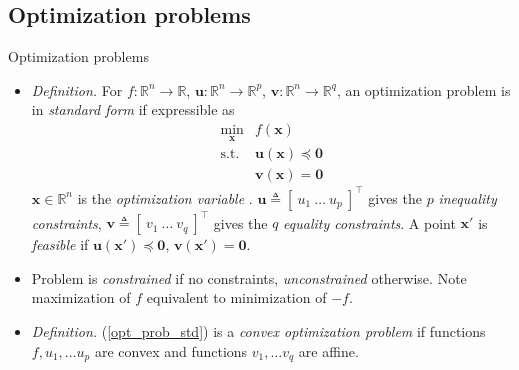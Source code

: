 \documentclass{beamer}
\numberwithin{equation}{section}
\newcommand{\aref}[1]{\alert{\ref{#1}}}
\begin{document}
\subsection{Optimization problems}

\begin{frame}{Optimization problems}
    \begin{itemize}
        \item
        \textit{Definition.} For $ f: \mathbb{R}^n \rightarrow \mathbb{R} $,
        $ \mathbf{u} : \mathbb{R}^n \rightarrow \mathbb{R}^p $,
        $ \mathbf{v} : \mathbb{R}^n \rightarrow \mathbb{R}^q $, an
        optimization problem is in \textit{standard form} if expressible as
        \cite{bv_convex_opt}
        \begin{equation} \label{opt_prob_std}
            \begin{array}{ll}
                \displaystyle\min_\mathbf{x} & f(\mathbf{x}) \\
                \text{s.t.} & \mathbf{u}(\mathbf{x}) \preceq \mathbf{0} \\
                & \mathbf{v}(\mathbf{x}) = \mathbf{0}
            \end{array}
        \end{equation}
        $ \mathbf{x} \in \mathbb{R}^n $ is the \textit{optimization
        variable} \cite{bv_convex_opt}. $ \mathbf{u} \triangleq
        [ \ u_1 \ \ldots \ u_p \ ]^\top $ gives the $ p $ \textit{inequality
        constraints}, $ \mathbf{v} \triangleq [ \ v_1 \ \ldots \ v_q \ ]^\top $
        gives the $ q $ \textit{equality constraints}. A point $ \mathbf{x}' $
        is \textit{feasible} if $ \mathbf{u}(\mathbf{x}') \preceq
        \mathbf{0} $, $ \mathbf{v}(\mathbf{x}') = \mathbf{0} $.

        \item
        Problem is \textit{constrained} if no constraints,
        \textit{unconstrained} otherwise. Note maximization of $ f $ 
        equivalent to minimization of $ -f $.

        \item
        \textit{Definition.} (\aref{opt_prob_std}) is a
        \textit{convex optimization problem} if functions
        $ f, u_1, \ldots u_p $ are convex and functions $ v_1, \ldots v_q $
        are affine.
    \end{itemize}
\end{frame}
\end{document}
